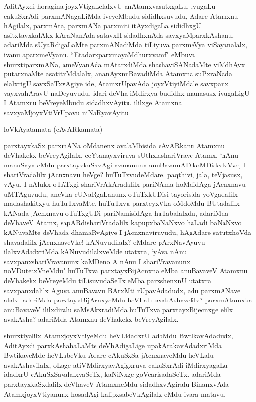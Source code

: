 \begin{artha}
AditAyxdi horagina joyxVtigaLelalxvU anAtamxvasutxgaLu. ivugaLu cakuSxrAdi parxmANagaLiMda iveyeMbudu sididhxsuvudu, Adare Atamxnu hAgilalx, parxmAta, parxmANa parxmiti itAyxdigaLa sididhxgU asitxtavxkalAkx kAraNanAda satavxH sidadhxnAda savxyaMparxkAshanu, adariMda sUyaRdigaLaMte parxmANadiMda tiLiyuva parxmeVya viSayanalalx, ivanu aparxmeVyanu. ``EtadarxparxmayaMdhurxvamf" eMbuva shurxtiparxmANa, ameVyanAda mAtarxdiMda shashaviSANadaMte viMdhAyx putarxnaMte asatitxMdalalx, ananAyxnuBavadiMda Atamxna suPxraNada elalxrigU savxSaTxvAgiye ide, AtamxrUpavAda joyxVtiyiMdale savxpanx vayxvahAravU naDeyuvudu. idari deVha iMdirxya budidhx manasusx ivugaLigU I Atamxnu beVreyeMbudu sidadhxvAyitu. ililxge Atamxna savxyaMjoyxVtiVrUpavu niNaRyavAyitu||
\end{artha}

\begin{center}%
loVkAyatamata (cAvARkamata)
\end{center}

\begin{artha}
parxtayxkaSx parxmANa oMdanenx avalaMbisida cAvARkanu Atamxnu deVhakekx beVreyAgilalx, ceYtanayxviruva sUthxlashariVrave Atamx, `nAnu manuSayx eMdu parxtayxkaSxvAgi avananunx anuBavamADikoMDidedxVve, I shariVradalilx jAcnxnavu heVge? huTuTxvudeMdare. paqthivi, jala, teVjasusx, vAyu, I nAlukx oTATxgi shariVrAkAradalilx pariNAma hoMdidAga jAcnxnavu uMTAguvudu, aneVka cUNaRgaLanunx oTuTxkUDisi tayorisida yoVgadalilx madashakitxyu huTuTxvaMte, huTuTxvu parxteyxVka oMdoMdu BUtadalilx kANada jAcnxnavu oTuTxgUDi pariNamisidAga huTabalalxdu, adariMda deVhaveV Atamx, sapARdishariVradalilx kapupxbaNaNxvo haLadi baNaNxvo kANuvaMte deVhada dhamaRvAgiye I jAcnxnaviruvudu, hAgAdare satutxhoVda shavadalilx jAcnxnaveVke! kANuvudilalx? eMdare pArxNavAyuvu ilalxvAdadxriMda kANuvudilalxveMde utatxra, `yAva nAnu savxpanxshariVravanunx kaMDeno A nAnu I shariVravanunx noVDutetxVneMdu" huTuTxva parxtayxBijAcnxna eMba anuBavaveV Atamxnu deVhakekx beVreyeMdu tiLisuvudaSeTx eMba parxshenxnU utatxra savxpanxdalilx Aguva anuBavavu BArxMti rUpavAdadudx, adu parxmANave alalx. adariMda parxtayxBijAcnxyeMdu heVLalu avakAshavelilx? parxmAtamxka anuBavaveV ililxdiralu saMsAkxradiMda huTuTxva parxtayxBijecnxge elilx avakAsha? adariMda Atamxnu deVhakekx beVreyAgilalx. 
\end{artha}

\begin{artha}
shurxtiyalilx AtamxjoyxVtiyeMdu heVLidadxrU adoMdu BwtikavAdadudx, AditAyxdi parxkAshahaLaMte deVhAdigaLige upakArakavAdadxriMda BwtikaveMde heVLabeVku Adare cAkuSxSa jAcnxnaveMdu heVLalu avakAshavilalx, oLage atiVMdirxyavAgigxruva cakuSxrAdi iMdirxyagaLu idadxrU cAkuSxSavalalxvaSeTx, kaNiNxge goVcarisadaSeTx. adariMda parxtayxkaSxdalilx deVhaveV AtamxneMdu sidadhxvAgiralu BinanxvAda AtamxjoyxVtiyanunx hosadAgi kalipxsabeVkAgilalx eMdu ivara matavu.
\end{artha}

